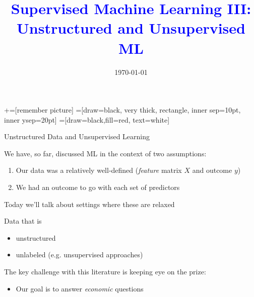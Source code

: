 \documentclass[notes,11pt, aspectratio=169]{beamer}
\title[]{\textcolor{blue}{Supervised Machine Learning III: \\ Unstructured and Unsupervised ML}} \author[PGP]{}
\institute[FRBNY]{\small{\begin{tabular}{c}
                           Paul Goldsmith-Pinkham  \\
\end{tabular}}}
\date{\today}
\newenvironment{wideitemize}{\itemize\addtolength{\itemsep}{10pt}}{\enditemize}
\begin{document}
\newcommand\marktopleft[1]{%
    \tikz[overlay,remember picture] 
        \node (marker-#1-a) at (-.3em,.3em) {};%
}
\newcommand\markbottomright[2]{%
    \tikz[overlay,remember picture] 
        \node (marker-#1-b) at (0em,0em) {};%
}
+=[remember picture] 
 =[draw=black, very thick, rectangle, inner sep=10pt, inner ysep=20pt]
 =[draw=black,fill=red, text=white]

\begin{frame}
\maketitle
\end{frame}

\begin{frame}{Unstructured Data and Unsupervised Learning}
  \begin{wideitemize}
  \item We have, so far, discussed ML in the context of two assumptions:
    \begin{enumerate}
    \item Our data was a relatively well-defined (\emph{feature} matrix $X$ and outcome $y$)
    \item We had an outcome to go with each set of predictors
    \end{enumerate}
  \item Today we'll talk about settings where these are relaxed
  \item Data that is 
    \begin{itemize}
    \item unstructured 
    \item unlabeled (e.g. unsupervised approaches)
    \end{itemize}
  \item The key challenge with this literature is keeping eye on the prize:
    \begin{itemize}
    \item Our goal is to answer \emph{economic} questions
    \end{itemize}
  \end{wideitemize}
\end{frame}
\end{document}
